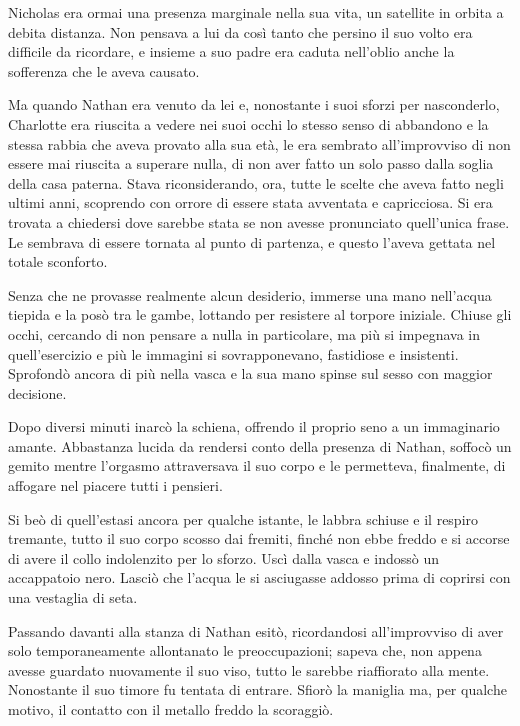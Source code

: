 \documentclass[a4paper,oneside,11pt]{memoir}
\begin{document}
Nicholas era ormai una presenza marginale nella sua vita, un satellite in orbita
a debita distanza. Non pensava a lui da così tanto che persino il suo volto era
difficile da ricordare, e insieme a suo padre era caduta nell'oblio anche la
sofferenza che le aveva causato.

Ma quando Nathan era venuto da lei e, nonostante i suoi sforzi per nasconderlo,
Charlotte era riuscita a vedere nei suoi occhi lo stesso senso di abbandono e la
stessa rabbia che aveva provato alla sua età, le era sembrato all'improvviso di
non essere mai riuscita a superare nulla, di non aver fatto un solo passo dalla
soglia della casa paterna. Stava riconsiderando, ora, tutte le scelte che aveva
fatto negli ultimi anni, scoprendo con orrore di essere stata avventata e
capricciosa. Si era trovata a chiedersi dove sarebbe stata se non avesse
pronunciato quell'unica frase. Le sembrava di essere tornata al punto di
partenza, e questo l'aveva gettata nel totale sconforto.

Senza che ne provasse realmente alcun desiderio, immerse una mano nell'acqua
tiepida e la posò tra le gambe, lottando per resistere al torpore iniziale.
Chiuse gli occhi, cercando di non pensare a nulla in particolare, ma più si
impegnava in quell'esercizio e più le immagini si sovrapponevano, fastidiose e
insistenti. Sprofondò ancora di più nella vasca e la sua mano spinse sul sesso
con maggior decisione.

Dopo diversi minuti inarcò la schiena, offrendo il proprio seno a un immaginario
amante. Abbastanza lucida da rendersi conto della presenza di Nathan, soffocò un
gemito mentre l'orgasmo attraversava il suo corpo e le permetteva, finalmente,
di affogare nel piacere tutti i pensieri.

Si beò di quell'estasi ancora per qualche istante, le labbra schiuse e il
respiro tremante, tutto il suo corpo scosso dai fremiti, finché non ebbe freddo
e si accorse di avere il collo indolenzito per lo sforzo. Uscì dalla vasca e
indossò un accappatoio nero. Lasciò che l'acqua le si asciugasse addosso prima
di coprirsi con una vestaglia di seta.

Passando davanti alla stanza di Nathan esitò, ricordandosi all'improvviso di
aver solo temporaneamente allontanato le preoccupazioni; sapeva che, non appena
avesse guardato nuovamente il suo viso, tutto le sarebbe riaffiorato alla mente.
Nonostante il suo timore fu tentata di entrare. Sfiorò la maniglia ma, per
qualche motivo, il contatto con il metallo freddo la scoraggiò.
\end{document}
